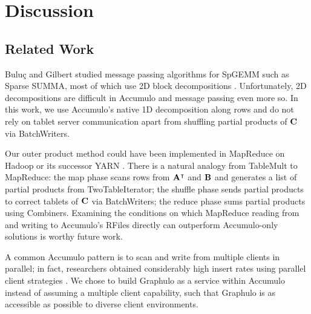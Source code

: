 
\section{Discussion}
\label{sDiscussion}

\subsection{Related Work} %
Bulu\c{c} and Gilbert studied message passing algorithms for SpGEMM
such as Sparse SUMMA, most of which use 2D block decompositions \cite{buluc2012parallel}.
Unfortunately, 2D decompositions are difficult in Accumulo 
and message passing even more so.
In this work, we use Accumulo's native 1D decomposition along rows 
and do not rely on tablet server communication
apart from shuffling partial products of $\mathbf{C}$ via BatchWriters.


Our outer product method could have been implemented in MapReduce %
on Hadoop or its successor YARN \cite{vavilapalli2013apache}.
There is a natural analogy from TableMult to MapReduce:
the map phase scans rows from $\mathbf{A^{\intercal}}$ and $\mathbf{B}$
and generates a list of partial products from TwoTableIterator;
the shuffle phase sends partial products to correct tablets of $\mathbf{C}$ via BatchWriters;
the reduce phase sums partial products using Combiners.
Examining the conditions on which MapReduce 
reading from and writing to Accumulo's RFiles directly
can outperform Accumulo-only solutions
is worthy future work.


A common Accumulo pattern is to 
scan and write from multiple clients in parallel;
in fact, researchers obtained 
considerably high insert rates using parallel client strategies \cite{kepner2014achieving}.
We chose to build Graphulo as a service within Accumulo
instead of assuming a multiple client capability,
such that Graphulo is as accessible as possible to diverse client environments.

